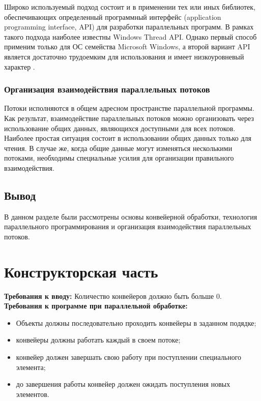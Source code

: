 \documentclass[12pt]{report}
\begin{document}
Широко используемый подход состоит и в применении тех или иных библиотек, обеспечивающих определенный программный интерфейс (application programming interface, API) для разработки параллельных программ. В рамках такого подхода наиболее известны Windows Thread API. Однако первый способ применим только для ОС семейства Microsoft Windows, а второй вариант API является достаточно трудоемким для использования и имеет низкоуровневый характер \cite{Barkalov}.

\subsection{Организация взаимодействия параллельных потоков}
Потоки исполняются в общем адресном пространстве параллельной программы. Как результат, взаимодействие параллельных потоков можно организовать через использование общих данных, являющихся доступными для всех потоков. Наиболее простая ситуация состоит в использовании общих данных только для чтения. В случае же, когда общие данные могут изменяться несколькими потоками, необходимы специальные усилия для организации правильного взаимодействия.

\section{Вывод}
В данном разделе были рассмотрены основы конвейерной обработки, технология параллельного программирования и
организация взаимодействия параллельных потоков.



\chapter{Конструкторская часть}
\textbf{Требования к вводу:}
Количество конвейеров должно быть больше 0.
\newline
\textbf{Требования к программе при параллельной обработке:}
\begin{itemize}
\item Объекты должны последовательно проходить конвейеры в заданном подядке;
\item конвейеры должны работать каждый в своем потоке;
\item конвейер должен завершать свою работу при поступлении специального элемента;
\item до завершения работы конвейер должен ожидать поступления новых элементов.
\end{itemize}
\end{document}
